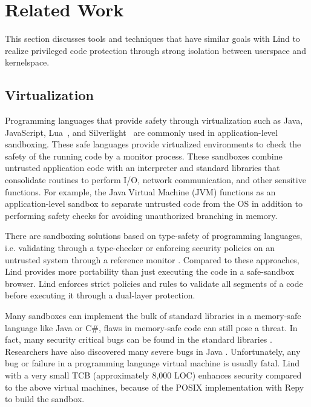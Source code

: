 \section{Related Work}
\label{sec.related_work}

This section discusses tools and techniques that have similar goals
with Lind to realize privileged code protection through strong
isolation between userspace and kernelspace.
	
\subsection{Virtualization}

Programming languages that provide safety through virtualization such
as Java, JavaScript, Lua~\cite{Lua}, and
Silverlight~\cite{Silverlight} are commonly used in application-level
sandboxing. These safe languages provide virtualized environments to
check the safety of the running code by a monitor process. These
sandboxes combine untrusted application code with an interpreter and
standard libraries that consolidate routines to perform I/O, network
communication, and other sensitive functions. For example, the Java
Virtual Machine (JVM) \cite{JVM} functions as an application-level
sandbox to separate untrusted code from the OS in addition to
performing safety checks for avoiding unauthorized branching in
memory.

There are sandboxing solutions based on type-safety of programming
languages, i.e. validating through a type-checker \cite{JS-Sandboxing}
or enforcing security policies on an untrusted system through a
reference monitor \cite{JS-Sandboxing1}. Compared to these approaches,
Lind provides more portability than just executing the code in a
safe-sandbox browser. Lind enforces strict policies and
rules to validate all segments of a code before executing it through a
dual-layer protection.

Many sandboxes can implement the bulk of standard libraries in a
memory-safe language like Java or C\#, flaws in memory-safe code can
still pose a threat. In fact, many security critical bugs can be found
in the standard libraries \cite{JavaBugs}. Researchers have also
discovered many severe bugs in Java \cite{Java-Lessons}.
Unfortunately, any bug or failure in a programming language virtual
machine is usually fatal. Lind with a very small TCB (approximately
8,000 LOC) enhances security compared to the above virtual machines,
because of the POSIX implementation with Repy to build the sandbox.

